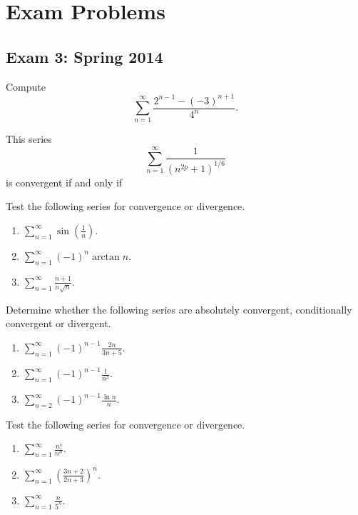 \chapter{Exam Problems}
\section{Exam 3: Spring 2014}
\setcounter{exercise}{0}
\begin{problem}
Compute
\[
\sum_{n=1}^\infty \frac{2^{n-1}-(-3)^{n+1}}{4^n}.
\]
\end{problem}
\begin{problem}
This series
\[
\sum_{n=1}^\infty\frac{1}{({n^{2p}+1})^{1/6}}
\]
is convergent if and only if
\end{problem}
\begin{problem}
Test the following series for convergence or divergence.
\begin{enumerate}[label=(\alph*)]
\item $\displaystyle\sum_{n=1}^\infty \sin\left(\frac{1}{n}\right)$.
\item $\displaystyle\sum_{n=1}^\infty(-1)^n\arctan n$.
\item $\displaystyle\sum_{n=1}^\infty\frac{n+1}{n\sqrt{n}}$.
\end{enumerate}
\end{problem}
\begin{problem}
Determine whether the following series are absolutely convergent,
conditionally convergent or divergent.
\begin{enumerate}[label=(\alph*)]
\item $\displaystyle\sum_{n=1}^\infty(-1)^{n-1}\frac{2n}{3n+5}$.
\item $\displaystyle\sum_{n=1}^\infty(-1)^{n-1}\frac{1}{n^3}$.
\item $\displaystyle\sum_{n=2}^\infty(-1)^{n-1}\frac{\ln n}{n}$.
\end{enumerate}
\end{problem}
\begin{problem}
Test the following series for convergence or divergence.
\begin{enumerate}[label=(\alph*)]
\item $\displaystyle\sum_{n=1}^\infty\frac{n!}{n^n}$.
\item $\displaystyle\sum_{n=1}^\infty\left(\frac{3n+2}{2n+3}\right)^n$.
\item $\displaystyle\sum_{n=1}^\infty\frac{n}{5^n}$.
\end{enumerate}
\end{problem}
